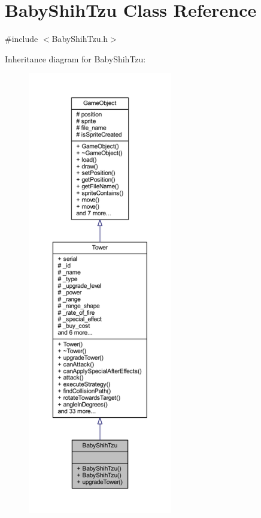 \hypertarget{class_baby_shih_tzu}{\section{Baby\+Shih\+Tzu Class Reference}
\label{class_baby_shih_tzu}
}


{\ttfamily \#include $<$Baby\+Shih\+Tzu.\+h$>$}



Inheritance diagram for Baby\+Shih\+Tzu\+:
\nopagebreak
\begin{figure}[H]
\begin{center}
\leavevmode
\includegraphics[height=550pt]{class_baby_shih_tzu__inherit__graph}
\end{center}
\end{figure}


